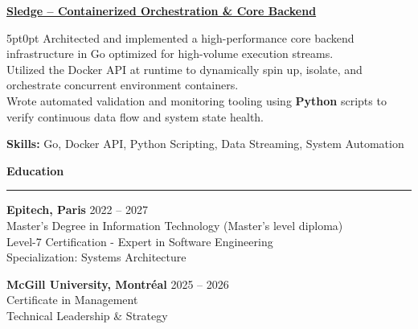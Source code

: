 \documentclass[9pt]{extarticle}
\begin{document}
\par\vspace{8pt}

\underline{\bfseries Sledge -- Containerized Orchestration \& Core Backend}
\par
\begin{adjustwidth}{5pt}{0pt}
    Architected and implemented a high-performance core backend infrastructure in Go optimized for high-volume execution streams. \\
    Utilized the Docker API at runtime to dynamically spin up, isolate, and orchestrate concurrent environment containers. \\
    Wrote automated validation and monitoring tooling using {\bfseries Python} scripts to verify continuous data flow and system state health.
\end{adjustwidth}
\par
{\bfseries Skills:} Go, Docker API, Python Scripting, Data Streaming, System Automation

\par\vspace{5pt}

{\large\bfseries Education}
\par\vspace{-8pt}
\rule{\linewidth}{0.4pt}
\par\vspace{5pt}

{\bfseries Epitech, Paris} \hfill 2022 -- 2027 \\ %
Master's Degree in Information Technology (Master's level diploma) \\ %
Level-7 Certification - Expert in Software Engineering \\ %
Specialization: Systems Architecture \\ %

\vspace{4pt}

{\bfseries McGill University, Montréal} \hfill 2025 -- 2026 \\ %
Certificate in Management \\ %
Technical Leadership \& Strategy %
\end{document}
